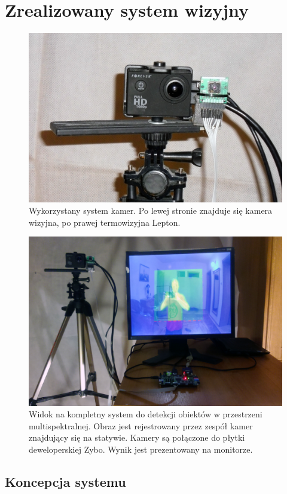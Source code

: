 \chapter{Zrealizowany system wizyjny} %
\label{cha:propSysWiz}

\begin{figure}
\centering
\includegraphics[width=0.65\linewidth]{images/kameraRGBIR.jpg}
\caption[Wykorzystany system kamer.]{Wykorzystany system kamer. Po lewej stronie znajduje się kamera wizyjna, po prawej termowizyjna Lepton.}
\label{fig:kameraRGBIR}
\end{figure}

\begin{figure}
\centering
\includegraphics[width=0.65\linewidth]{images/systemOverview.jpg}
\caption[Widok na kompletny system.]{Widok na kompletny system do detekcji obiektów w przestrzeni multispektralnej. Obraz jest rejestrowany przez zespół kamer znajdujący się na statywie. Kamery są połączone do płytki deweloperskiej Zybo. Wynik jest prezentowany na monitorze.}
\label{fig:systemOverview}
\end{figure}

\section{Koncepcja systemu}

